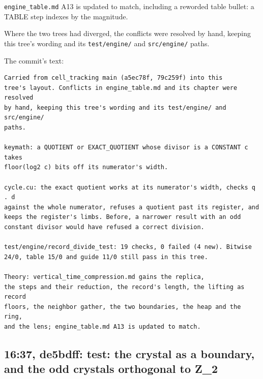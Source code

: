 \texttt{engine\_\allowbreak{}table.\allowbreak{}md} A13 is updated to match, including a reworded table bullet: a TABLE step indexes by the magnitude.

Where the two trees had diverged, the conflicts were resolved by hand, keeping this tree's wording and its \texttt{test/\allowbreak{}engine/\allowbreak{}} and \texttt{src/\allowbreak{}engine/\allowbreak{}} paths.

The commit's text:

\begin{Verbatim}
Carried from cell_tracking main (a5ec78f, 79c259f) into this
tree's layout. Conflicts in engine_table.md and its chapter were resolved
by hand, keeping this tree's wording and its test/engine/ and src/engine/
paths.

keymath: a QUOTIENT or EXACT_QUOTIENT whose divisor is a CONSTANT c takes
floor(log2 c) bits off its numerator's width.

cycle.cu: the exact quotient works at its numerator's width, checks q . d
against the whole numerator, refuses a quotient past its register, and
keeps the register's limbs. Before, a narrower result with an odd
constant divisor would have refused a correct division.

test/engine/record_divide_test: 19 checks, 0 failed (4 new). Bitwise
24/0, table 15/0 and guide 11/0 still pass in this tree.

Theory: vertical_time_compression.md gains the replica,
the steps and their reduction, the record's length, the lifting as record
floors, the neighbor gather, the two boundaries, the heap and the ring,
and the lens; engine_table.md A13 is updated to match.
\end{Verbatim}

\subsection{\texorpdfstring{16:37, de5bdff: test: the crystal as a boundary, and the odd crystals orthogonal to Z\_\allowbreak{}2}{16:37, de5bdff: test: the crystal as a boundary, and the odd crystals orthogonal to Z\_2}}

